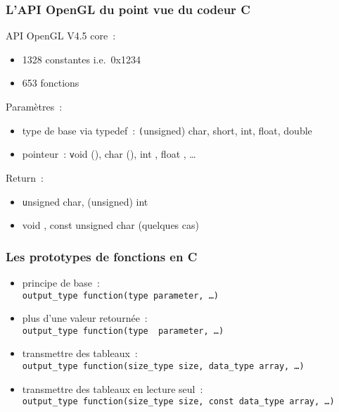 
\begin{frame}
  \frametitle{L'API OpenGL du point vue du codeur C}
  API OpenGL V4.5 core~: %
  \begin{itemize}
  \item 1328 constantes \small{i.e.\ 0x1234} %
  \item 653 fonctions \\[.5em] %
  \end{itemize}
  Paramètres~:
  \begin{itemize}
  \item type de base via typedef~: {\texttt (unsigned) char, short, int, float, double}
  \item pointeur~: {\texttt void \ptr(\ptr), char \ptr(\ptr), int \ptr, float \ptr, \ldots} \\[.5em] %
  \end{itemize}
  Return~:
  \begin{itemize}
  \item {\texttt unsigned char, (unsigned) int}
  \item {void \ptr, const unsigned char \ptr} {\tiny (quelques cas)}
  \end{itemize}
\end{frame}

\begin{frame}
  \frametitle{Les prototypes de fonctions en C}
  \begin{itemize}
    \item principe de base~: \\
      \texttt{output\_type function(type parameter, \ldots)}
    \item plus d'une valeur retournée~: \\
      \texttt{output\_type function(type \alert{\ptr} parameter, \ldots)}
    \item transmettre des tableaux~: \\
      \texttt{output\_type function(size\_type size, data\_type \ptr array, \ldots)}
    \item transmettre des tableaux en lecture seul~: \\
      \texttt{output\_type function(size\_type size, \alert{const} data\_type \ptr array, \ldots)}
  \end{itemize}
\end{frame}

